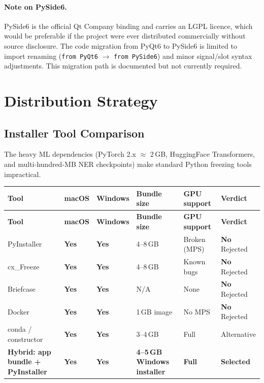 \documentclass[12pt]{article}
\newcommand{\code}[1]{\texttt{#1}}
\newcommand{\yes}{\textcolor{green!60!black}{\textbf{Yes}}}
\newcommand{\no}{\textcolor{red!70!black}{\textbf{No}}}
\begin{document}
\paragraph{Note on PySide6.} PySide6 is the official Qt Company binding and carries an LGPL licence, which would be preferable if the project were ever distributed commercially without source disclosure. The code migration from PyQt6 to PySide6 is limited to import renaming (\code{from PyQt6} $\to$ \code{from PySide6}) and minor signal/slot syntax adjustments. This migration path is documented but not currently required.


\section{Distribution Strategy}
\label{sec:distribution}

\subsection{Installer Tool Comparison}

The heavy ML dependencies (PyTorch 2.x $\approx$ 2\,GB, HuggingFace Transformers, and multi-hundred-MB NER checkpoints) make standard Python freezing tools impractical.

\begin{longtable}{|l|l|l|p{2cm}|l|l|}
\hline
\textbf{Tool} & \textbf{macOS} & \textbf{Windows} & \textbf{Bundle size} & \textbf{GPU support} & \textbf{Verdict} \\
\hline
\endfirsthead
\hline
\textbf{Tool} & \textbf{macOS} & \textbf{Windows} & \textbf{Bundle size} & \textbf{GPU support} & \textbf{Verdict} \\
\hline
\endhead
\hline
\endfoot
PyInstaller & \yes & \yes & 4--8\,GB & Broken (MPS) & \no{} Rejected \\
\hline
cx\_Freeze & \yes & \yes & 4--8\,GB & Known bugs & \no{} Rejected \\
\hline
Briefcase & \yes & \yes & N/A & None & \no{} Rejected \\
\hline
Docker & \yes & \yes & 1\,GB image & No MPS & \no{} Rejected \\
\hline
conda / constructor & \yes & \yes & 3--4\,GB & Full & Alternative \\
\hline
\textbf{Hybrid: app bundle + PyInstaller} & \textbf{\yes} & \textbf{\yes} & \textbf{4--5\,GB Windows installer} & \textbf{Full} & \textbf{Selected} \\
\hline
\end{longtable}
\end{document}
